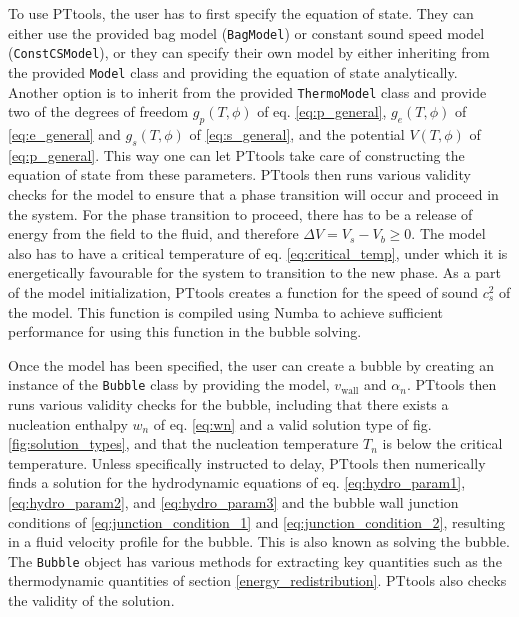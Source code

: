 To use PTtools, the user has to first specify the equation of state.
They can either use the provided bag model (\verb|BagModel|) or constant sound speed model (\verb|ConstCSModel|),
or they can specify their own model by either inheriting from the provided \texttt{Model} class and providing the equation of state analytically.
Another option is to inherit from the provided \verb|ThermoModel| class and provide two of the degrees of freedom $g_p(T,\phi)$ of eq. \eqref{eq:p_general}, $g_e(T,\phi)$ of \eqref{eq:e_general} and $g_s(T,\phi)$ of \eqref{eq:s_general}, and the potential $V(T,\phi)$ of \eqref{eq:p_general}.
This way one can let PTtools take care of constructing the equation of state from these parameters.
PTtools then runs various validity checks for the model to ensure that a phase transition will occur and proceed in the system.
For the phase transition to proceed, there has to be a release of energy from the field to the fluid,
and therefore $\Delta V = V_s - V_b \geq 0$.
The model also has to have a critical temperature of eq. \eqref{eq:critical_temp},
under which it is energetically favourable for the system to transition to the new phase.
As a part of the model initialization, PTtools creates a function for the speed of sound $c_s^2$ of the model.
This function is compiled using Numba to achieve sufficient performance for using this function in the bubble solving.

Once the model has been specified,
the user can create a bubble by creating an instance of the \verb|Bubble| class by providing the model, $v_\text{wall}$ and $\alpha_n$.
PTtools then runs various validity checks for the bubble,
including that there exists a nucleation enthalpy $w_n$ of eq. \eqref{eq:wn} and a valid solution type of fig. \ref{fig:solution_types},
and that the nucleation temperature $T_n$ is below the critical temperature.
Unless specifically instructed to delay,
PTtools then numerically finds a solution for the hydrodynamic equations of eq. \eqref{eq:hydro_param1}, \eqref{eq:hydro_param2}, and \eqref{eq:hydro_param3} and the bubble wall junction conditions of \eqref{eq:junction_condition_1} and \eqref{eq:junction_condition_2},
resulting in a fluid velocity profile for the bubble.
This is also known as solving the bubble.
The \verb|Bubble| object has various methods for extracting key quantities such as the thermodynamic quantities of section \ref{energy_redistribution}.
PTtools also checks the validity of the solution.

